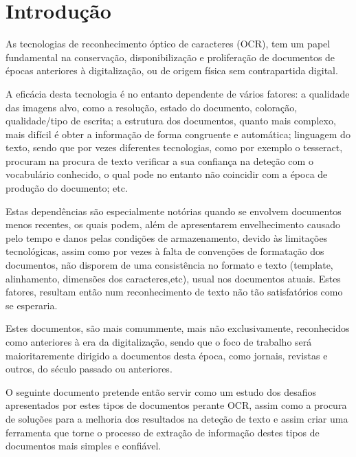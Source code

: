 \chapter{Introdução}


As tecnologias de reconhecimento óptico de caracteres (OCR), tem um papel fundamental na conservação, disponibilização e proliferação de documentos de épocas anteriores à digitalização, ou de origem física sem contrapartida digital.

A eficácia desta tecnologia é no entanto dependente de vários fatores: a qualidade das imagens alvo, como a resolução, estado do documento, coloração, qualidade/tipo de escrita; a estrutura dos documentos, quanto mais complexo, mais difícil é obter a informação de forma congruente e automática; linguagem do texto, sendo que por vezes diferentes tecnologias, como por exemplo o tesseract, procuram na procura de texto verificar a sua confiança na deteção com o vocabulário conhecido, o qual pode no entanto não coincidir com a época de produção do documento; etc. 

Estas dependências são especialmente notórias quando se envolvem documentos menos recentes, os quais podem, além de apresentarem envelhecimento causado pelo tempo e danos pelas condições de armazenamento, devido às limitações tecnológicas, assim como por vezes à falta de convenções de formatação dos documentos, não disporem de uma consistência no formato e texto (template, alinhamento, dimensões dos caracteres,etc), usual nos documentos atuais. Estes fatores, resultam então num reconhecimento de texto não tão satisfatórios como se esperaria. 

Estes documentos, são mais comummente, mais não exclusivamente, reconhecidos como anteriores à era da digitalização, sendo que o foco de trabalho será maioritaremente dirigido a documentos desta época, como jornais, revistas e outros, do século passado ou anteriores. 

O seguinte documento pretende então servir como um estudo dos desafios apresentados por estes tipos de documentos perante OCR, assim como a procura de soluções para a melhoria dos resultados na deteção de texto e assim criar uma ferramenta que torne o processo de extração de informação destes tipos de documentos mais simples e confiável. 

